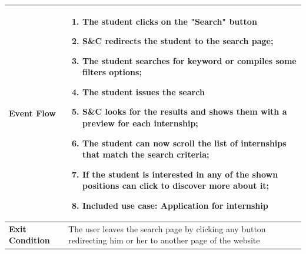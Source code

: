 \begin{enumerate}[label=\textbf{[US\arabic*]}, left = 0pt, align = left, resume]
\begin{longtable}{|l|p{11cm}|}
                \textbf{Event Flow} &
                    \begin{enumerate}[label=\arabic*., itemsep=0.2em]
                        \item The student clicks on the "Search" button
                        \item S\&C redirects the student to the search page;
                        \item The student searches for keyword or compiles some filters options;
                        \item The student issues the search
                        \item S\&C looks for the results and shows them with a preview for each internship;
                        \item The student can now scroll the list of internships that match the search criteria;
                        \item If the student is interested in any of the shown positions can click to discover more about it;
                        \item Included use case: Application for internship
                    \end{enumerate} \\
                \hline
                
                \textbf{Exit Condition} & 
                    The user leaves the search page by clicking any button redirecting him or her to another page of the website \\
                \hline
                

\end{longtable}
\end{enumerate}
